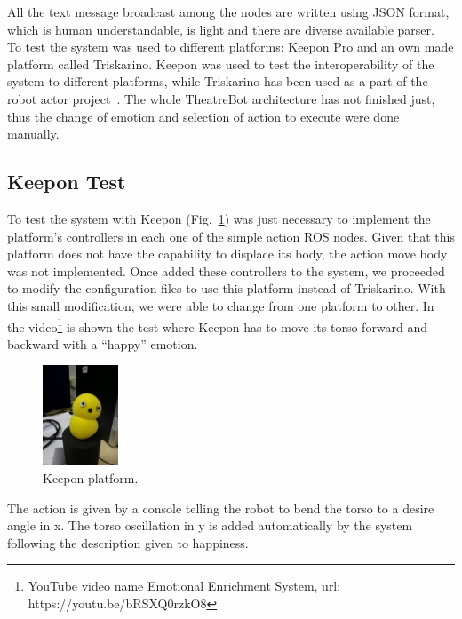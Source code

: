 All the text message broadcast among the nodes are written using JSON format, which is human understandable, is light and there are diverse available parser.\\ 
To test the system was used to different platforms: Keepon Pro and an own made platform called Triskarino.
Keepon was used to test the interoperability of the system to different platforms, while Triskarino has been used as a part of the robot actor project~\cite{angel2013}. The whole TheatreBot architecture has not finished just, thus the change of emotion and selection of action to execute were done manually.
\subsection{Keepon Test}
To test the system with Keepon (Fig.~\ref{fig:keepon}) was just necessary to implement the platform's controllers in each one of the simple action ROS nodes. Given that this platform does not have the capability to displace its body, the action move body was not implemented. Once added these controllers to the system, we proceeded to modify the configuration files to use this platform instead of Triskarino. With this small modification, we were able to change from one platform to other. In the video\footnote{YouTube video name Emotional Enrichment System, url: https://youtu.be/bRSXQ0rzkO8}
 is shown the test where Keepon has to move its torso forward and backward with a ``happy'' emotion. 
\begin{figure}
	\centering
	\includegraphics[width=0.2\textwidth]{./Images/Keepon.jpg}
	\caption{Keepon platform.}
	\label{fig:keepon}
\end{figure} 
 The action is given by a console telling the robot to bend the torso to a desire angle in x. The torso oscillation in y is added automatically by the system following the description given to happiness. 
